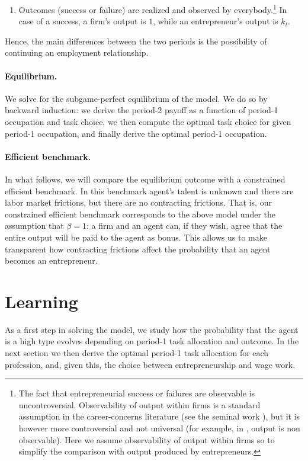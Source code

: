 \documentclass[12pt,american]{paper}
\theoremstyle{remark}
\begin{document}
\begin{enumerate}[(1)]
	\item Outcomes (success or failure) are realized and observed by everybody.\footnote{The fact that entrepreneurial success or failures are observable is uncontroversial. Observability of output within firms is a standard assumption in the career-concerns literature (see the seminal work \citealp{holmstrom1999managerial}), but it is however more controversial and not universal (for example, in \citealp{waldman1984job}, output is non observable). Here we assume observability of output within firms so to simplify the comparison with output produced by entrepreneurs.}  
In  case of a success, a firm's output is $1$, while an entrepreneur's output is $k_{t}$.
	\end{enumerate}
Hence, the main differences between the two periods is the possibility of continuing an employment relationship.


\paragraph{Equilibrium.}  We solve for the subgame-perfect equilibrium of the model.  We do so by backward induction: we derive the period-2 payoff as a function of period-1 occupation and task choice, we then compute the optimal task choice for given period-1 occupation, and finally derive the optimal period-1 occupation.

\paragraph{Efficient benchmark.} In what follows, we will compare the equilibrium outcome with a constrained efficient benchmark. In this benchmark agent's talent is unknown and there are labor market frictions, but there are no contracting frictions. That is, our constrained efficient benchmark corresponds to the above model under the assumption that $\beta=1$: a firm and an agent can, if they wish, agree that the entire output will be paid to the agent as bonus. This allows us to make transparent how contracting frictions affect the probability that an agent becomes an entrepreneur.

 
\section{Learning\label{sec:learning}}
As a first step in solving the model, we study how the probability that the agent is a high type evolves depending on period-1 task allocation and outcome. In the next section we then derive the optimal period-1 task allocation for each profession, and, given this, the choice between entrepreneurship and wage work.
\end{document}
